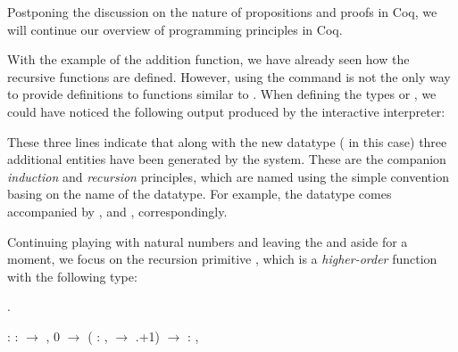Postponing the discussion on the nature of propositions and proofs in
Coq, we will continue our overview of programming principles in Coq.


With the example of the addition function, we have already seen how
the recursive functions are defined. However, using the 
command is not the only way to provide definitions to functions
similar to . When defining the types  or , we
could have noticed the following output produced by the interactive
interpreter:
\coqdoceol
\coqdocemptyline
\coqdocnoindent
{}  \coqdoceol
\coqdocnoindent
{}  \coqdoceol
\coqdocnoindent
{}  \coqdoceol
\coqdocnoindent
{}  

\coqdocemptyline
These three lines indicate that along with the new datatype ( in
this case) three additional entities have been generated by the
system. These are the companion \textit{induction} and \textit{recursion}
principles, which are named using the simple convention basing on the
name of the datatype. For example, the  datatype comes
accompanied by ,  and , correspondingly.


Continuing playing with natural numbers and leaving the  and
 aside for a moment, we focus on the recursion primitive
, which is a \textit{higher-order} function with the following type:


\begin{coqdoccode}
\coqdocemptyline
\coqdocnoindent
{} .\coqdoceol
\end{coqdoccode}


\coqdoceol
\coqdocemptyline
\coqdocnoindent
{} : \coqdockw{\ensuremath{\forall}}  :  \ensuremath{\rightarrow} ,\coqdoceol
\coqdocindent{5.00em}
 0 \ensuremath{\rightarrow} (\coqdockw{\ensuremath{\forall}}  : ,   \ensuremath{\rightarrow}  .+1) \ensuremath{\rightarrow} \coqdockw{\ensuremath{\forall}}  : ,  

